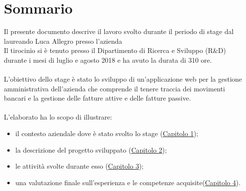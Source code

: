 
\cleardoublepage
{}
{}
\begingroup
\let\clearpage\relax
\let\cleardoublepage\relax
\let\cleardoublepage\relax

\chapter*{Sommario}

Il presente documento descrive il lavoro svolto durante il periodo di stage dal laureando
Luca Allegro presso l'azienda \vic{} \\
Il tirocinio si è tenuto presso il Dipartimento di Ricerca e Sviluppo (R\&D) durante i mesi di
luglio e agosto 2018 e ha avuto la durata di 310 ore.
\\ \\
L’obiettivo dello stage è stato lo sviluppo di un’applicazione web per la gestione amministrativa
dell'azienda che comprende il tenere traccia dei movimenti bancari e la gestione delle fatture attive e 
delle fatture passive.
\\ \\
L'elaborato ha lo scopo di illustrare:
\begin{itemize}
	\item il contesto aziendale dove è stato svolto lo stage ({\hyperref[cap:azienda]{Capitolo 1}});
	\item la descrizione del progetto sviluppato ({\hyperref[cap:progetto]{Capitolo 2}});
	\item le attività svolte durante esso ({\hyperref[cap:svolgimento]{Capitolo 3}});
	\item una valutazione finale sull'esperienza e le competenze acquisite({\hyperref[cap:valutazione]{Capitolo 4}}).
\end{itemize}


